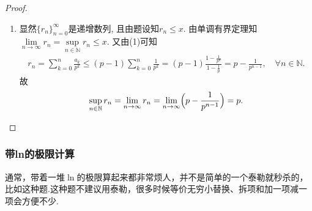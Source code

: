 \documentclass[../../main.tex]{subfiles}%
\begin{document}
\begin{proof}
\begin{enumerate}[(1)]
\item 显然$\{r_n\}_{n=0}^{\infty}$是递增数列, 且由题设知$r_n\leqslant x$. 由单调有界定理知$\lim\limits_{n\rightarrow \infty}r_n=\sup\limits_{n\in \mathbb{N}}r_n\leqslant x$. 又由(1)可知
\begin{align*}
r_n=\sum_{k=0}^n\frac{a_k}{p^k}\leqslant (p-1)\sum_{k=0}^n\frac{1}{p^k}=(p-1)\frac{1-\frac{1}{p^n}}{1-\frac{1}{p}}=p-\frac{1}{p^{n-1}},\quad \forall n\in \mathbb{N}.
\end{align*}
故
\begin{align*}
\sup_{n\in \mathbb{N}}r_n=\lim_{n\rightarrow \infty}r_n=\lim_{n\rightarrow \infty}\Bigl( p-\frac{1}{p^{n-1}} \Bigr) =p.
\end{align*}
\end{enumerate}
\end{proof}


\subsubsection{带ln的极限计算}
通常，带着一堆\(\ln\)的极限算起来都非常烦人，并不是简单的一个泰勒就秒杀的，比如这种题.这种题不建议用泰勒，很多时候等价无穷小替换、拆项和加一项减一项会方便不少.
\end{document}
